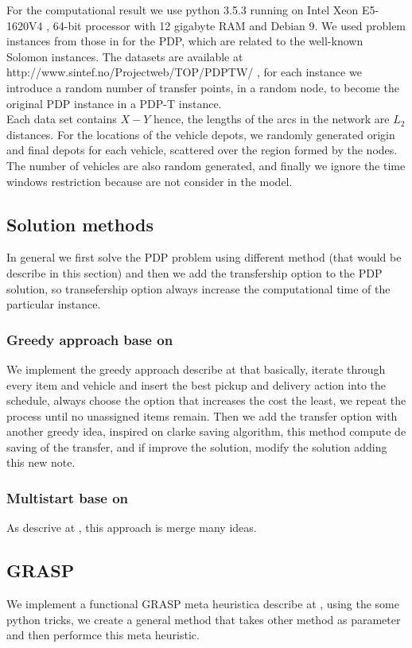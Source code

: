 \documentclass[10pt,twoside]{article}
\begin{document}
For the computational result we use python 3.5.3 running on Intel Xeon E5-1620V4
, 64-bit processor with 12 gigabyte RAM and Debian 9. We used problem instances
from those in for the PDP, which are related to the well-known Solomon instances.
The datasets are available at http://www.sintef.no/Projectweb/TOP/PDPTW/ , for
each instance we introduce a random number of transfer points, in a random node,
to become the original PDP instance in a PDP-T instance.\\

Each data set contains $X - Y$ hence, the lengths of the arcs in the network are
$L_2$ distances. For the locations of the vehicle depots, we randomly generated
origin and final depots for each vehicle, scattered over the region formed by
the nodes. The number of vehicles are also random generated, and finally we
ignore the time windows restriction because are not consider in the model.

\subsection{Solution methods}\label{sec_sol}
In general we first solve the PDP problem using different method (that would be
describe in this section) and then we add the transfership option to the PDP
solution, so transefership option always increase the computational time of the
particular instance.

\subsubsection{Greedy approach base on \cite{multiagent}}
We implement the greedy approach describe at \cite{multiagent} that basically,
iterate through every item and vehicle and insert the best pickup and delivery
action into the schedule, always choose the option that increases the cost the
least, we repeat the process until no unassigned items remain. Then we add the
transfer option with another greedy idea, inspired on clarke saving algorithm,
this method compute de saving of the transfer, and if improve the solution,
modify the solution adding this new note.

\subsubsection{Multistart base on \cite{multistart}}
As descrive at \cite{multistart}, this approach is merge many ideas.


\subsection{GRASP}
We implement a functional GRASP meta heuristica describe at \cite{bGRASP}, using
the some python tricks, we create a general method that takes other method as
parameter and then performce this meta heuristic.
\end{document}
